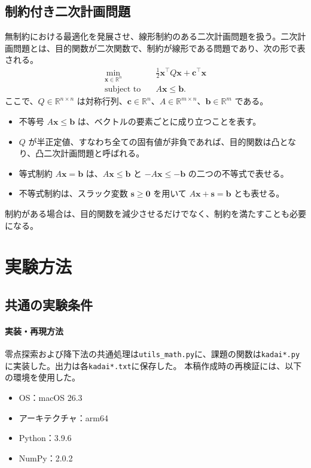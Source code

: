 \documentclass[a4j]{jarticle}
\begin{document}
\subsection{制約付き二次計画問題}
\label{sec:qp-principle}
無制約における最適化を発展させ、線形制約のある二次計画問題を扱う。二次計画問題とは、目的関数が二次関数で、制約が線形である問題であり、次の形で表される。
\begin{equation}
  \begin{aligned}
    \min_{\bm{x}\in\mathbb{R}^n}\quad
    &\frac12\bm{x}^\top Q\bm{x}+\bm{c}^\top\bm{x}\\
    \operatorname{subject\ to}\quad&A\bm{x}\le\bm{b}.
  \end{aligned}
  \label{eq:qp-principle}
\end{equation}
ここで、$Q\in\mathbb{R}^{n\times n}$ は対称行列、$\bm{c}\in\mathbb{R}^n$、$A\in\mathbb{R}^{m\times n}$、$\bm{b}\in\mathbb{R}^m$ である。
\begin{itemize}
  \item 不等号 $A\bm{x}\le\bm{b}$ は、ベクトルの要素ごとに成り立つことを表す。
  \item $Q$ が半正定値、すなわち全ての固有値が非負であれば、目的関数は凸となり、凸二次計画問題と呼ばれる。
  \item 等式制約 $A\bm{x}=\bm{b}$ は、$A\bm{x}\le\bm{b}$ と $-A\bm{x}\le-\bm{b}$ の二つの不等式で表せる。
  \item 不等式制約は、スラック変数 $\bm{s}\ge\bm{0}$ を用いて $A\bm{x}+\bm{s}=\bm{b}$ とも表せる。
\end{itemize}
制約がある場合は、目的関数を減少させるだけでなく、制約を満たすことも必要になる。

\clearpage
\section{実験方法}
\label{sec:experiment}
\subsection{共通の実験条件}
\paragraph{実装・再現方法}
零点探索および降下法の共通処理は\texttt{utils\_math.py}に、課題の関数は\texttt{kadai*.py}に実装した。出力は各\texttt{kadai*.txt}に保存した。
本稿作成時の再検証には、以下の環境を使用した。
\begin{itemize}
  \item OS：macOS 26.3
  \item アーキテクチャ：arm64
  \item Python：3.9.6
  \item NumPy：2.0.2
\end{itemize}
\end{document}
